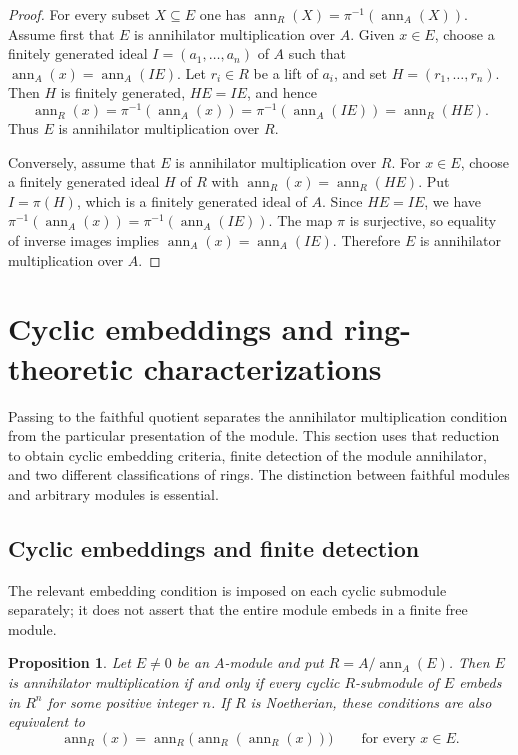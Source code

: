 \documentclass[11pt]{amsart}
\theoremstyle{plain}
\newtheorem{proposition}[theorem]{Proposition}
\theoremstyle{definition}
\theoremstyle{remark}
\newcommand{\ann}{\operatorname{ann}}
\numberwithin{equation}{section}
\begin{document}
\begin{proof}
For every subset $X\subseteq E$ one has $\ann_R(X)=\pi^{-1}(\ann_A(X)).$
Assume first that $E$ is annihilator multiplication over $A$. Given $x\in E$,
choose a finitely generated ideal $I=(a_1,\ldots,a_n)$ of $A$ such that
$\ann_A(x)=\ann_A(IE)$. Let $r_i\in R$ be a lift of $a_i$, and set
$H=(r_1,\ldots,r_n)$. Then $H$ is finitely generated, $HE=IE$, and hence
\[
\ann_R(x)=\pi^{-1}(\ann_A(x))= \pi^{-1}(\ann_A(IE))=\ann_R(HE).
\]
Thus $E$ is annihilator multiplication over $R$.

Conversely, assume that $E$ is annihilator multiplication over $R$. For
$x\in E$, choose a finitely generated ideal $H$ of $R$ with
$\ann_R(x)=\ann_R(HE)$. Put $I=\pi(H)$, which is a finitely generated ideal of
$A$. Since $HE=IE$, we have $\pi^{-1}(\ann_A(x))=\pi^{-1}(\ann_A(IE)).$
The map $\pi$ is surjective, so equality of inverse images implies
$\ann_A(x)=\ann_A(IE)$. Therefore $E$ is annihilator multiplication over $A$.
\end{proof}

\section{Cyclic embeddings and ring-theoretic characterizations}
\label{sec:structural}

Passing to the faithful quotient separates the annihilator multiplication
condition from the particular presentation of the module. This section
uses that reduction to obtain cyclic embedding criteria, finite detection
of the module annihilator, and two different classifications of rings.
The distinction between faithful modules and arbitrary modules is essential.

\subsection{Cyclic embeddings and finite detection}

The relevant embedding condition is imposed on each cyclic submodule
separately; it does not assert that the entire module embeds in a finite
free module.

\begin{proposition}\label{prop:cyclic-embedding}
Let $E\ne0$ be an $A$-module and put $R=A/\ann_A(E)$.
Then $E$ is annihilator multiplication if and only if every cyclic
$R$-submodule of $E$ embeds in $R^n$ for some positive integer $n$.
If $R$ is Noetherian, these conditions are also equivalent to
\[
 \ann_R(x)=\ann_R\bigl(\ann_R(\ann_R(x))\bigr)
 \qquad\text{for every }x\in E.
\]
\end{proposition}
\end{document}
